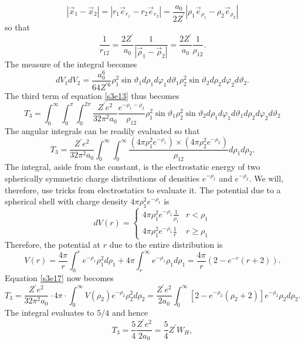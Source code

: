 \documentclass{article}
\numberwithin{equation}{section}
\begin{document}
\[
|\vec{x}_1 - \vec{x}_2| = |r_1 \vec{e}_{r_1} - r_2 \vec{e}_{r_2}| = \frac{a_0}{2Z^\prime}|\rho_1\vec{e}_{\rho_1} - \rho_2\vec{e}_{\rho_2}|
\]
so that
\begin{equation}\label{s3e14}
\frac{1}{r_{12}} = \frac{2Z^\prime}{a_0}\frac{1}{|\vec{\rho}_1 - \vec{\rho}_2|} = \frac{2Z^\prime}{a_0}\frac{1}{\rho_{12}}.
\end{equation}
The measure of the integral becomes
\begin{equation}\label{s3e15}
dV_1 dV_2 = \frac{a_0^6}{64 Z^{\prime 6}}\rho_1^2\sin\vartheta_1d\rho_1 d\varphi_1 d\vartheta_1\rho_2^2\sin\vartheta_2d\rho_2 d\varphi_2 d\vartheta_2.
\end{equation}
The third term of equation \eqref{s3e13} thus becomes
\begin{equation}\label{s3e16}
T_3 = \int_0^\infty \int_0^\pi \int_0^{2\pi}\frac{Z^\prime e^2}{32\pi^2 a_0}\frac{e^{-\rho_1 - \rho_2}}{\rho_{12}}\rho_1^2\sin\vartheta_1\rho_2^2\sin\vartheta_2 
d\rho_1d\varphi_1d\vartheta_1 d\rho_2d\varphi_2d\vartheta_2
\end{equation}
The angular integrals can be readily evaluated so that
\begin{equation}\label{s3e17}
T_3 = \frac{Z^\prime e^2}{32\pi^2 a_0}\int_0^\infty\int_0^\infty \frac{(4\pi\rho_1^2e^{-\rho_1}) \times (4\pi\rho_2^2e^{-\rho_2})}{\rho_{12}}d\rho_1 d\rho_2.
\end{equation}
The integral, aside from the constant, is the electrostatic energy of two
spherically symmetric charge distributions of densities $e^{-\rho_1}$ and
$e^{-\rho_2}$. We will, therefore, use tricks from electrostatics to evaluate
it. The potential due to a spherical shell with charge density $4\pi\rho_1^2e^{-\rho_1}$
is
\[
dV(r) = \begin{cases}
4\pi\rho_1^2e^{-\rho_1}\frac{1}{\rho_1} & r < \rho_1 \\
4\pi\rho_1^2e^{-\rho_1}\frac{1}{r}      & r \ge \rho_1
\end{cases}
\]
Therefore, the potential at $r$ due to the entire distribution is
\[
V(r) = \frac{4\pi}{r}\int_0^re^{-\rho_1}\rho_1^2d\rho_1 + 4\pi\int_r^\infty e^{-\rho_1}\rho_1d\rho_1 = \frac{4\pi}{r}(2 - e^{-r}(r + 2)).
\]
Equation \eqref{s3e17} now becomes
\[
T_3 = \frac{Z^\prime e^2}{32\pi^2 a_0}\cdot 4\pi\cdot\int_0^\infty V(\rho_2)e^{-\rho_2}\rho_2^2d\rho_2
 = \frac{Z^\prime e^2}{2a_0}\int_0^\infty [2 - e^{-\rho_2}(\rho_2 +2)]e^{-\rho_2}\rho_2d\rho_2.
\]
The integral evaluates to $5/4$ and hence
\begin{equation}\label{s3e18}
T_3 = \frac{5}{4}\frac{Z^\prime e^2}{2a_0} = \frac{5}{4}Z^\prime W_H,
\end{equation}
\end{document}
